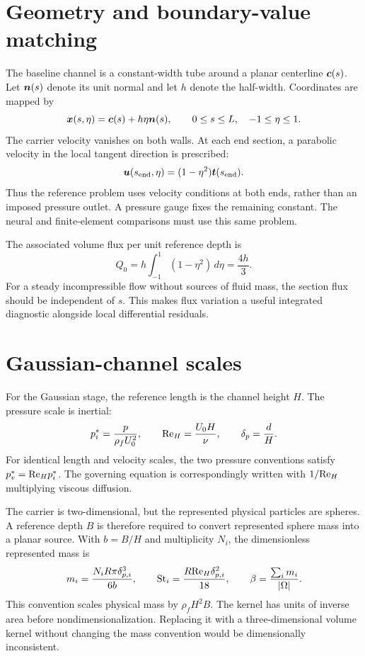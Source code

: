 \section{Geometry and boundary-value matching}
The baseline channel is a constant-width tube around a planar centerline
$\bm{c}(s)$. Let $\bm{n}(s)$ denote its unit normal and let $h$ denote
the half-width. Coordinates are mapped by
\begin{equation}
 \bm{x}(s,\eta)=\bm{c}(s)+h\eta\bm{n}(s),\qquad
 0\leq s\leq L,\quad -1\leq\eta\leq1.
 \label{eq:centerline_map}
\end{equation}
The carrier velocity vanishes on both walls. At each end section, a
parabolic velocity in the local tangent direction is prescribed:
\begin{equation}
 \bm{u}(s_{\mathrm{end}},\eta)
 =(1-\eta^2)\bm{t}(s_{\mathrm{end}}).
 \label{eq:end_bc}
\end{equation}
Thus the reference problem uses velocity conditions at both ends, rather
than an imposed pressure outlet. A pressure gauge fixes the remaining
constant. The neural and finite-element comparisons must use this same
problem.

The associated volume flux per unit reference depth is
\begin{equation}
 Q_0=h\int_{-1}^{1}(1-\eta^2)\,d\eta=\frac{4h}{3}.
 \label{eq:flux}
\end{equation}
For a steady incompressible flow without sources of fluid mass, the section
flux should be independent of $s$. This makes flux variation a useful
integrated diagnostic alongside local differential residuals.

\section{Gaussian-channel scales}
For the Gaussian stage, the reference length is the channel height $H$.
The pressure scale is inertial:
\begin{equation}
 p_i^{*}=\frac{p}{\rho_f U_0^2},\qquad
 \mathrm{Re}_H=\frac{U_0H}{\nu},\qquad \delta_p=\frac{d}{H}.
 \label{eq:gaussian_scales}
\end{equation}
For identical length and velocity scales, the two pressure conventions
satisfy $p_v^{*}=\mathrm{Re}_H p_i^{*}$. The governing equation is correspondingly
written with $1/\mathrm{Re}_H$ multiplying viscous diffusion.

The carrier is two-dimensional, but the represented physical particles are
spheres. A reference depth $B$ is therefore required to convert represented
sphere mass into a planar source. With $b=B/H$ and multiplicity $N_i$, the
dimensionless represented mass is
\begin{equation}
 m_i=\frac{N_iR\pi\delta_{p,i}^3}{6b},\qquad
 \mathrm{St}_i=\frac{R\mathrm{Re}_H\delta_{p,i}^2}{18},\qquad
 \beta=\frac{\sum_i m_i}{|\Omega|}.
 \label{eq:parcel_mass}
\end{equation}
This convention scales physical mass by $\rho_fH^2B$. The kernel has units
of inverse area before nondimensionalization. Replacing it with a
three-dimensional volume kernel without changing the mass convention would
be dimensionally inconsistent.

